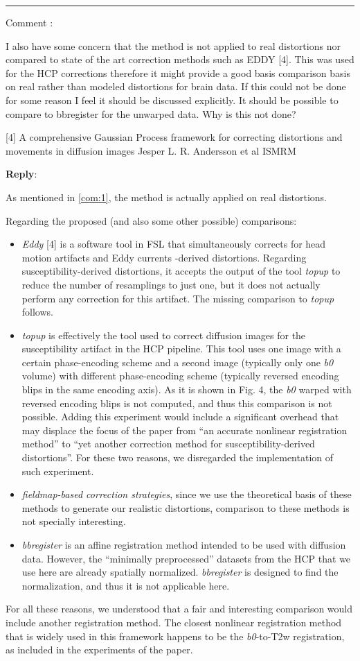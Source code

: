 \documentclass[9pt]{memoir}
\newcounter{reviewpoint}
\newenvironment{reviewpoint}%
{\refstepcounter{reviewpoint}\par\medskip\vspace{3ex}\hrule\vspace{1.5ex}\par\noindent%
   {\fontseries{b}\selectfont Comment \arabic{reviewpoint}:}
   \begingroup%
   \color{black!60}
   \fontshape{it}\selectfont %

}
{\endgroup\label{com:\thereviewpoint}\par\medskip}
\newcommand{\reply}{\par\fontshape{n}\selectfont \noindent \textbf{Reply}:\ }
\begin{document}
\begin{reviewpoint}
I also have some concern that the method is not applied to real distortions nor compared to state of the art correction methods such as EDDY [4]. This was used for the HCP corrections therefore it might provide a good basis comparison basis on real rather than modeled distortions for brain data. If this could not be done for some reason I feel it should be discussed explicitly. It should be possible to compare to bbregister for the unwarped data. Why is this not done?

[4] A comprehensive Gaussian Process framework for correcting distortions and movements in diffusion images Jesper L. R. Andersson et al ISMRM
\end{reviewpoint}
\reply{%
As mentioned in \autoref{com:1}, the method is actually applied on real distortions.

Regarding the proposed (and also some other possible) comparisons:
\begin{itemize}
\item \emph{Eddy} [4] is a software tool in FSL that simultaneously corrects for
    head motion artifacts and Eddy currents -derived distortions.
  Regarding susceptibility-derived distortions, it accepts the output of the tool 
    \emph{topup} to reduce the number of resamplings to just one, but it does not
    actually perform any correction for this artifact.
  The missing comparison to \emph{topup} follows.
\item \emph{topup} is effectively the tool used to correct diffusion images for the
  susceptibility artifact in the HCP pipeline.
  This tool uses one image with a certain phase-encoding scheme and a second image
    (typically only one \emph{b0} volume) with different phase-encoding scheme (typically
    reversed encoding blips in the same encoding axis).
  As it is shown in Fig. 4, the \emph{b0} warped with reversed encoding blips is not
    computed, and thus this comparison is not possible.
  Adding this experiment would include a significant overhead that may displace the focus
    of the paper from ``an accurate nonlinear registration method'' to ``yet another 
    correction method for susceptibility-derived distortions''.
  For these two reasons, we disregarded the implementation of such experiment.
\item \emph{fieldmap-based correction strategies}, since we use the theoretical basis of these
  methods to generate our realistic distortions, comparison to these methods is not specially
  interesting.
\item \emph{bbregister} is an affine registration method intended to be used with diffusion
  data.
  However, the ``minimally preprocessed'' datasets from the HCP that we use here are already
  spatially normalized.
  \emph{bbregister} is designed to find the normalization, and thus it is not applicable
  here.
\end{itemize}
For all these reasons, we understood that a fair and interesting comparison would include
  another registration method.
The closest nonlinear registration method that is widely used in this framework happens
  to be the \emph{b0}-to-T2w registration, as included in the experiments of the paper.
}
\end{document}
